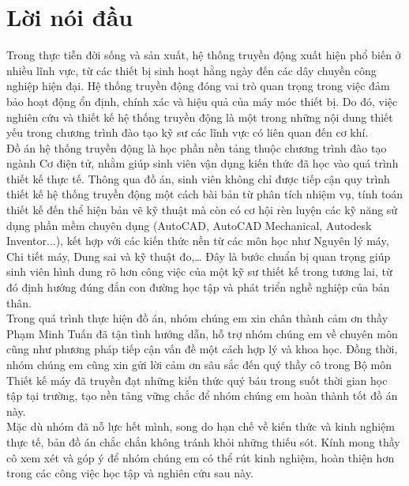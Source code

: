 \chapter*{Lời nói đầu}


\hspace{0.5cm}Trong thực tiễn đời sống và sản xuất, hệ thống truyền động xuất hiện phổ biến ở nhiều lĩnh vực, từ các thiết bị sinh hoạt hằng ngày đến các dây chuyền công nghiệp hiện đại. Hệ thống truyền động đóng vai trò quan trọng trong việc đảm bảo hoạt động ổn định, chính xác và hiệu quả của máy móc thiết bị. Do đó, việc nghiên cứu và thiết kế hệ thống truyền động là một trong những nội dung thiết yếu trong chương trình đào tạo kỹ sư các lĩnh vực có liên quan đến cơ khí. \\

Đồ án hệ thống truyền động là học phần nền tảng thuộc chương trình đào tạo ngành Cơ điện tử, nhằm giúp sinh viên vận dụng kiến thức đã học vào quá trình thiết kế thực tế. Thông qua đồ án, sinh viên không chỉ được tiếp cận quy trình thiết kế hệ thống truyền động một cách bài bản từ phân tích nhiệm vụ, tính toán thiết kế đến thể hiện bản vẽ kỹ thuật mà còn có cơ hội rèn luyện các kỹ năng sử dụng phần mềm chuyên dụng (AutoCAD, AutoCAD Mechanical, Autodesk Inventor...), kết hợp với các kiến thức nền từ các môn học như Nguyên lý máy, Chi tiết máy, Dung sai và kỹ thuật đo,… 
Đây là bước chuẩn bị quan trọng giúp sinh viên hình dung rõ hơn công việc của một kỹ sư thiết kế trong tương lai, từ đó định hướng đúng đắn con đường học tập và phát triển nghề nghiệp của bản thân.\\

Trong quá trình thực hiện đồ án, nhóm chúng em xin chân thành cảm ơn thầy Phạm Minh Tuấn đã tận tình hướng dẫn, hỗ trợ nhóm chúng em về chuyên môn cũng như phương pháp tiếp cận vấn đề một cách hợp lý và khoa học. Đồng thời, nhóm chúng em cũng xin gửi lời cảm ơn sâu sắc đến quý thầy cô trong Bộ môn Thiết kế máy đã truyền đạt những kiến thức quý báu trong suốt thời gian học tập tại trường, tạo nền tảng vững chắc để nhóm chúng em hoàn thành tốt đồ án này.\\

Mặc dù nhóm đã nỗ lực hết mình, song do hạn chế về kiến thức và kinh nghiệm thực tế, bản đồ án chắc chắn không tránh khỏi những thiếu sót. Kính mong thầy cô xem xét và góp ý để nhóm chúng em có thể rút kinh nghiệm, hoàn thiện hơn trong các công việc học tập và nghiên cứu sau này.
